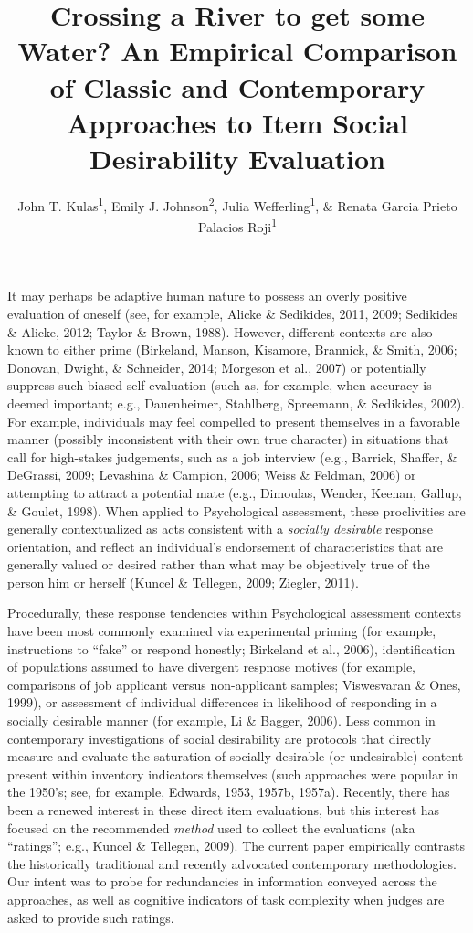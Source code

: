 \documentclass[
  english,
  ,jou]{apa6}
\title{Crossing a River to get some Water? An Empirical Comparison of Classic and Contemporary Approaches to Item Social Desirability Evaluation}
\author{John T. Kulas\textsuperscript{1}, Emily J. Johnson\textsuperscript{2}, Julia Wefferling\textsuperscript{1}, \& Renata Garcia Prieto Palacios Roji\textsuperscript{1}}
\date{}
\affiliation{\vspace{0.5cm}\textsuperscript{1} Montclair State University\\\textsuperscript{2} St.~Cloud State University}
\begin{document}
\maketitle

It may perhaps be adaptive human nature to possess an overly positive evaluation of oneself (see, for example, Alicke \& Sedikides, 2011, 2009; Sedikides \& Alicke, 2012; Taylor \& Brown, 1988). However, different contexts are also known to either prime (Birkeland, Manson, Kisamore, Brannick, \& Smith, 2006; Donovan, Dwight, \& Schneider, 2014; Morgeson et al., 2007) or potentially suppress such biased self-evaluation (such as, for example, when accuracy is deemed important; e.g., Dauenheimer, Stahlberg, Spreemann, \& Sedikides, 2002). For example, individuals may feel compelled to present themselves in a favorable manner (possibly inconsistent with their own true character) in situations that call for high-stakes judgements, such as a job interview (e.g., Barrick, Shaffer, \& DeGrassi, 2009; Levashina \& Campion, 2006; Weiss \& Feldman, 2006) or attempting to attract a potential mate (e.g., Dimoulas, Wender, Keenan, Gallup, \& Goulet, 1998). When applied to Psychological assessment, these proclivities are generally contextualized as acts consistent with a \emph{socially desirable} response orientation, and reflect an individual's endorsement of characteristics that are generally valued or desired rather than what may be objectively true of the person him or herself (Kuncel \& Tellegen, 2009; Ziegler, 2011).

Procedurally, these response tendencies within Psychological assessment contexts have been most commonly examined via experimental priming (for example, instructions to ``fake'' or respond honestly; Birkeland et al., 2006), identification of populations assumed to have divergent respnose motives (for example, comparisons of job applicant versus non-applicant samples; Viswesvaran \& Ones, 1999), or assessment of individual differences in likelihood of responding in a socially desirable manner (for example, Li \& Bagger, 2006). Less common in contemporary investigations of social desirability are protocols that directly measure and evaluate the saturation of socially desirable (or undesirable) content present within inventory indicators themselves (such approaches were popular in the 1950's; see, for example, Edwards, 1953, 1957b, 1957a). Recently, there has been a renewed interest in these direct item evaluations, but this interest has focused on the recommended \emph{method} used to collect the evaluations (aka ``ratings''; e.g., Kuncel \& Tellegen, 2009). The current paper empirically contrasts the historically traditional and recently advocated contemporary methodologies. Our intent was to probe for redundancies in information conveyed across the approaches, as well as cognitive indicators of task complexity when judges are asked to provide such ratings.
\end{document}
